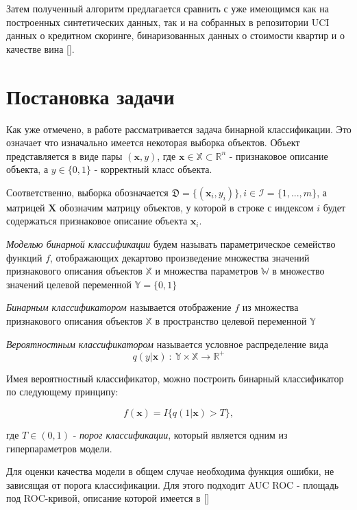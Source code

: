 \documentclass[12pt,twoside]{article}
\begin{document}
Затем полученный алгоритм предлагается сравнить с уже имеющимся как на построенных синтетических данных, так и на собранных в репозитории UCI данных о кредитном скоринге, бинаризованных данных о стоимости квартир и о качестве вина [].

\section{Постановка задачи}

Как уже отмечено, в работе рассматривается задача бинарной классификации. Это означает что изначально имеется некоторая выборка объектов. Объект представляется в виде пары $(\mathbf{x}, y)$, где $\mathbf{x} \in \mathbb{X} \subset \mathbb{R}^n$ - признаковое описание объекта, а $y \in \{0, 1\}$ - корректный класс объекта.

Соответственно, выборка обозначается $\mathfrak{D} = \{(\mathbf{x}_i, y_i)\}, i \in \mathcal{I} = \{1, ..., m\}$, а матрицей $\mathbf{X}$ обозначим матрицу объектов, у которой в строке с индексом $i$ будет содержаться признаковое описание объекта $\mathbf{x}_i$.

\begin{Def}
	\emph{Моделью бинарной классификации} будем называть параметрическое семейство функций $f$, отображающих декартово произведение множества значений признакового описания объектов $\mathbb{X}$ и множества параметров $\mathbb{W}$ в множество значений целевой переменной $\mathbb{Y} = \{0, 1\}$
\end{Def}

\begin{Def}
	\emph{Бинарным классификатором} называется отображение $f$ из множества признакового описания объектов $\mathbb{X}$ в пространство целевой переменной $\mathbb{Y}$
\end{Def}

\begin{Def}
	\emph{Вероятностным классификатором} называется условное распределение вида
	$$ q(y|\mathbf{x})\ :\ \mathbb{Y} \times \mathbb{X} \rightarrow \mathbb{R}^{+}$$
\end{Def}

Имея вероятностный классификатор, можно построить бинарный классификатор по следующему принципу:

$$f(\mathbf{x}) = I\{q(1|\mathbf{x}) > T\},$$

где $T \in (0, 1)$ - \emph{порог классификации}, который является одним из гиперпараметров модели.

Для оценки качества модели в общем случае необходима функция ошибки, не зависящая от порога классификации. Для этого подходит AUC ROC - площадь под ROC-кривой, описание которой имеется в []
\end{document}
